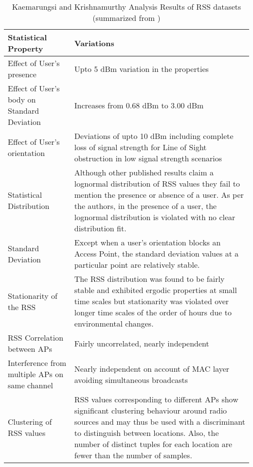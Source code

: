 \begin{table}
\centering
\begin{tabular}{p{2in} p{3in}}
\hline
\hline
Statistical Property & Variations \\
\hline

Effect of User’s presence &
Upto 5 dBm variation in the properties \\

Effect of User’s body on Standard Deviation &
Increases from 0.68 dBm to 3.00 dBm \\

Effect of User’s orientation &
Deviations of upto 10 dBm including complete loss of signal strength for Line of Sight obstruction in low signal strength scenarios \\

Statistical Distribution &
Although other published results claim a lognormal distribution of RSS values they fail to mention the presence or absence of a user. As per the authors, in the presence of a user, the lognormal distribution is violated with no clear distribution fit. \\

Standard Deviation &
Except when a user’s orientation blocks an Access Point, the standard deviation values at a particular point are relatively stable. \\

Stationarity of the RSS &
The RSS distribution was found to be fairly stable and exhibited ergodic properties at small time scales but stationarity was violated over longer time scales of the order of hours due to environmental changes. \\

RSS Correlation between APs &
Fairly uncorrelated, nearly independent \\

Interference from multiple APs on same channel & 
Nearly independent on account of MAC layer avoiding simultaneous broadcasts \\

Clustering of RSS values &
RSS values corresponding to different APs show significant clustering behaviour around radio sources and may thus be used with a discriminant to distinguish between locations. Also, the number of distinct tuples for each location are fewer than the number of samples. \\

\hline
\end{tabular}
\caption{Kaemarungsi and Krishnamurthy Analysis Results of RSS datasets (summarized from \cite{KStats})\label{tbl:RSSStats}}
\end{table}

